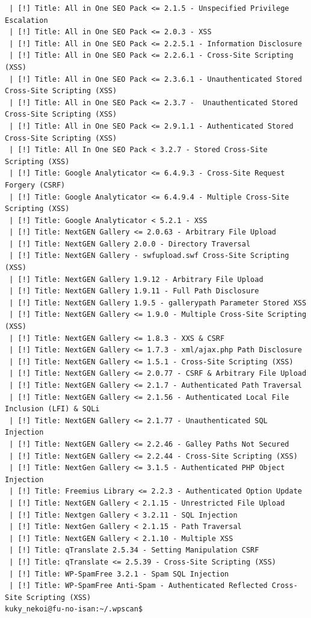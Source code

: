 \documentclass[11pt]{utalcaDoc}
\begin{document}
\begin{verbatim}
 | [!] Title: All in One SEO Pack <= 2.1.5 - Unspecified Privilege Escalation
 | [!] Title: All in One SEO Pack <= 2.0.3 - XSS 
 | [!] Title: All in One SEO Pack <= 2.2.5.1 - Information Disclosure
 | [!] Title: All in One SEO Pack <= 2.2.6.1 - Cross-Site Scripting (XSS)
 | [!] Title: All in One SEO Pack <= 2.3.6.1 - Unauthenticated Stored Cross-Site Scripting (XSS)
 | [!] Title: All in One SEO Pack <= 2.3.7 -  Unauthenticated Stored Cross-Site Scripting (XSS)
 | [!] Title: All in One SEO Pack <= 2.9.1.1 - Authenticated Stored Cross-Site Scripting (XSS)
 | [!] Title: All In One SEO Pack < 3.2.7 - Stored Cross-Site Scripting (XSS)
 | [!] Title: Google Analyticator <= 6.4.9.3 - Cross-Site Request Forgery (CSRF)
 | [!] Title: Google Analyticator <= 6.4.9.4 - Multiple Cross-Site Scripting (XSS)
 | [!] Title: Google Analyticator < 5.2.1 - XSS
 | [!] Title: NextGEN Gallery <= 2.0.63 - Arbitrary File Upload
 | [!] Title: NextGEN Gallery 2.0.0 - Directory Traversal
 | [!] Title: NextGEN Gallery - swfupload.swf Cross-Site Scripting (XSS)
 | [!] Title: NextGEN Gallery 1.9.12 - Arbitrary File Upload
 | [!] Title: NextGEN Gallery 1.9.11 - Full Path Disclosure
 | [!] Title: NextGEN Gallery 1.9.5 - gallerypath Parameter Stored XSS
 | [!] Title: NextGEN Gallery <= 1.9.0 - Multiple Cross-Site Scripting (XSS)
 | [!] Title: NextGEN Gallery <= 1.8.3 - XXS & CSRF
 | [!] Title: NextGEN Gallery <= 1.7.3 - xml/ajax.php Path Disclosure
 | [!] Title: NextGEN Gallery <= 1.5.1 - Cross-Site Scripting (XSS)
 | [!] Title: NextGEN Gallery <= 2.0.77 - CSRF & Arbitrary File Upload
 | [!] Title: NextGEN Gallery <= 2.1.7 - Authenticated Path Traversal
 | [!] Title: NextGEN Gallery <= 2.1.56 - Authenticated Local File Inclusion (LFI) & SQLi
 | [!] Title: NextGEN Gallery <= 2.1.77 - Unauthenticated SQL Injection
 | [!] Title: NextGEN Gallery <= 2.2.46 - Galley Paths Not Secured
 | [!] Title: NextGEN Gallery <= 2.2.44 - Cross-Site Scripting (XSS)
 | [!] Title: NextGen Gallery <= 3.1.5 - Authenticated PHP Object Injection
 | [!] Title: Freemius Library <= 2.2.3 - Authenticated Option Update 
 | [!] Title: NextGEN Gallery < 2.1.15 - Unrestricted File Upload
 | [!] Title: Nextgen Gallery < 3.2.11 - SQL Injection
 | [!] Title: NextGen Gallery < 2.1.15 - Path Traversal
 | [!] Title: NextGEN Gallery < 2.1.10 - Multiple XSS
 | [!] Title: qTranslate 2.5.34 - Setting Manipulation CSRF
 | [!] Title: qTranslate <= 2.5.39 - Cross-Site Scripting (XSS)
 | [!] Title: WP-SpamFree 3.2.1 - Spam SQL Injection 
 | [!] Title: WP-SpamFree Anti-Spam - Authenticated Reflected Cross-Site Scripting (XSS)
kuky_nekoi@fu-no-isan:~/.wpscan$ 
\end{verbatim}
\end{document}
